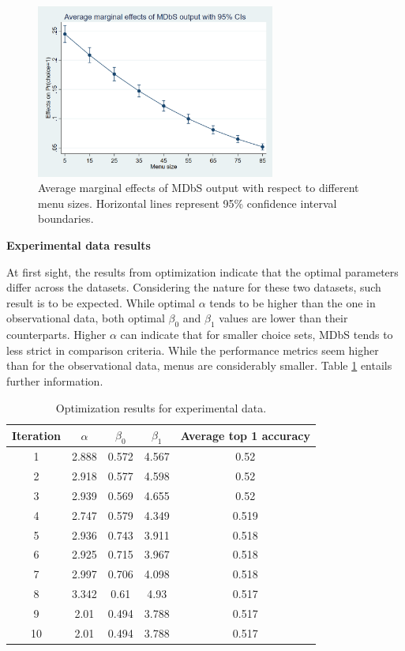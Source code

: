 \documentclass[a4paper,12pt]{article}
\begin{document}
\begin{figure}[h]
    \centering
    \includegraphics[width=0.7\textwidth]{staticFiles/marginsAmadeusGraph.png}
    \caption[Marginal effects of MDbS output]{Average marginal effects of MDbS output with respect to different menu sizes. Horizontal lines represent 95\% confidence interval boundaries.} %
    \label{fig:marginsAmadeusGraph} %

\end{figure}

\textbf{Experimental data results}

At first sight, the results from optimization indicate that the optimal parameters differ across the datasets. Considering the nature for these two datasets, such result is to be expected. While optimal $\alpha$ tends to be higher than the one in observational data, both optimal $\beta_0$ and $\beta_1$ values are lower than their counterparts. Higher $\alpha$ can indicate that for smaller choice sets, MDbS tends to less strict in comparison criteria. While the performance metrics seem higher than for the observational data, menus are considerably smaller. Table \ref{tab:optimizationNoghuchiResults} entails further information.


\begin{table}
    \centering
    
    \begin{tabular}{ccccc}
    \hline
    Iteration & $\alpha$ & $\beta_0$ & $\beta_1$ & Average top 1 accuracy\\
    \hline
    1 & 2.888 & 0.572 & 4.567 & 0.52 \\
    2 & 2.918 & 0.577 & 4.598 & 0.52 \\
    3 & 2.939 & 0.569 & 4.655 & 0.52 \\
    4 & 2.747 & 0.579 & 4.349 & 0.519 \\
    5 & 2.936 & 0.743 & 3.911 & 0.518 \\
    6 & 2.925 & 0.715 & 3.967 & 0.518 \\
    7 & 2.997 & 0.706 & 4.098 & 0.518 \\
    8 & 3.342 & 0.61 & 4.93 & 0.517 \\
    9 & 2.01 & 0.494 & 3.788 & 0.517 \\
    10 & 2.01 & 0.494 & 3.788 & 0.517 \\
    \hline
    \end{tabular}
    \caption{Optimization results for experimental data.}
    \label{tab:optimizationNoghuchiResults}
\end{table}
\end{document}

